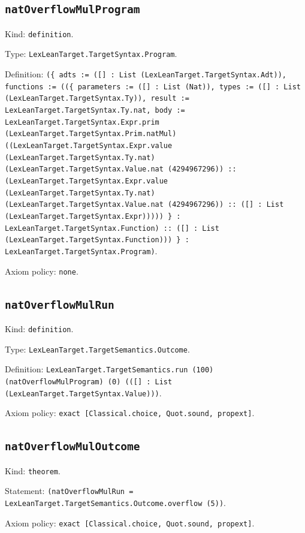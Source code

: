 \documentclass[11pt]{article}
\begin{document}
\subsection*{\texttt{natOverflowMulProgram}}
\noindent Kind: \texttt{definition}.\par
\noindent Type: \texttt{LexLeanTarget.TargetSyntax.Program}.\par
\noindent Definition: \texttt{(\{ adts := ([] : List (LexLeanTarget.TargetSyntax.Adt)), functions := ((\{ parameters := ([] : List (Nat)), types := ([] : List (LexLeanTarget.TargetSyntax.Ty)), result := LexLeanTarget.TargetSyntax.Ty.nat, body := LexLeanTarget.TargetSyntax.Expr.prim (LexLeanTarget.TargetSyntax.Prim.natMul) ((LexLeanTarget.TargetSyntax.Expr.value (LexLeanTarget.TargetSyntax.Ty.nat) (LexLeanTarget.TargetSyntax.Value.nat (4294967296)) :: (LexLeanTarget.TargetSyntax.Expr.value (LexLeanTarget.TargetSyntax.Ty.nat) (LexLeanTarget.TargetSyntax.Value.nat (4294967296)) :: ([] : List (LexLeanTarget.TargetSyntax.Expr))))) \} : LexLeanTarget.TargetSyntax.Function) :: ([] : List (LexLeanTarget.TargetSyntax.Function))) \} : LexLeanTarget.TargetSyntax.Program)}.\par
\noindent Axiom policy: \texttt{none}.\par
\subsection*{\texttt{natOverflowMulRun}}
\noindent Kind: \texttt{definition}.\par
\noindent Type: \texttt{LexLeanTarget.TargetSemantics.Outcome}.\par
\noindent Definition: \texttt{LexLeanTarget.TargetSemantics.run (100) (natOverflowMulProgram) (0) (([] : List (LexLeanTarget.TargetSyntax.Value)))}.\par
\noindent Axiom policy: \texttt{exact [Classical.choice, Quot.sound, propext]}.\par
\subsection*{\texttt{natOverflowMulOutcome}}
\noindent Kind: \texttt{theorem}.\par
\noindent Statement: \texttt{(natOverflowMulRun = LexLeanTarget.TargetSemantics.Outcome.overflow (5))}.\par
\noindent Axiom policy: \texttt{exact [Classical.choice, Quot.sound, propext]}.\par
\end{document}
